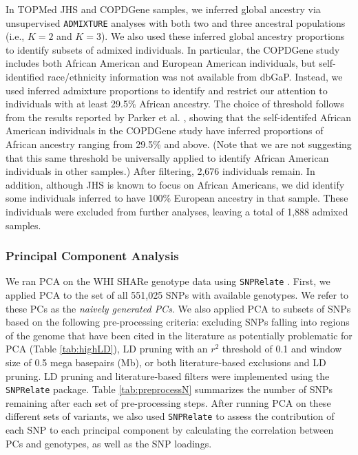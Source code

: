 \documentclass[12pt]{article}
\begin{document}
In TOPMed JHS and COPDGene samples, we inferred global ancestry via unsupervised \texttt{ADMIXTURE} analyses with both two and three ancestral populations (i.e., $K = 2$ and $K = 3$). 
We also used these inferred global ancestry proportions to identify subsets of admixed individuals.
In particular, the COPDGene study includes both African American and European American individuals, but  self-identified race/ethnicity information was not available from dbGaP.
Instead, we used inferred admixture proportions to identify and restrict our attention to individuals with at least 29.5\% African ancestry.
The choice of threshold follows from the results reported by Parker et al. \cite{parker2014}, showing that the self-identifed African American individuals in the COPDGene study have inferred proportions of African ancestry ranging from 29.5\% and above.
(Note that we are not suggesting that this same threshold be universally applied to identify African American individuals in other samples.)
After filtering, 2,676 individuals remain. 
In addition, although JHS is known to focus on African Americans, we did identify some individuals inferred to have 100\% European ancestry in that sample.
These individuals were excluded from further analyses, leaving a total of 1,888 admixed samples. 


\subsubsection{Principal Component Analysis}

We ran PCA on the WHI SHARe genotype data using \texttt{SNPRelate} \citep{snprelate}. 
First, we applied PCA to the set of all 551,025 SNPs with available genotypes.
We refer to these PCs as the \textit{naively generated PCs}.
We also applied PCA to subsets of SNPs based on the following pre-processing criteria: excluding SNPs falling into regions of the genome that have been cited in the literature as potentially problematic for PCA (Table \ref{tab:highLD}), LD pruning with an $r^2$ threshold of 0.1 and window size of 0.5 mega basepairs (Mb), or both literature-based exclusions and LD pruning.
LD pruning and literature-based filters were implemented using the \texttt{SNPRelate} package.
Table \ref{tab:preprocessN} summarizes the number of SNPs remaining after each set of pre-processing steps.
After running PCA on these different sets of variants, we also used \texttt{SNPRelate} to assess the contribution of each SNP to each principal component by calculating the correlation between PCs and genotypes, as well as the SNP loadings.
\end{document}

